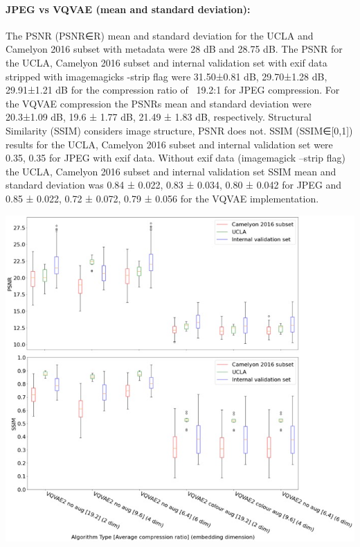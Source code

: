 \documentclass[review]{elsarticle}
\begin{document}
\paragraph{JPEG vs VQVAE (mean and standard deviation):} The PSNR (PSNR∈R) mean and standard deviation for the UCLA and Camelyon 2016 subset with metadata were 28 dB and 28.75 dB. The PSNR for the UCLA, Camelyon 2016 subset and internal validation set with exif data stripped with imagemagicks -strip flag were 31.50±0.81 dB, 29.70±1.28 dB, 29.91±1.21 dB for the compression ratio of ~19.2:1 for JPEG compression. For the VQVAE compression the PSNRs mean and standard deviation were 20.3±1.09 dB, 19.6 ± 1.77 dB, 21.49 ± 1.83 dB, respectively. Structural Similarity (SSIM) considers image structure, PSNR does not. SSIM (SSIM∈[0,1]) results for the UCLA, Camelyon 2016 subset and internal validation set were 0.35, 0.35 for JPEG with exif data. Without exif data (imagemagick –strip flag) the UCLA, Camelyon 2016 subset and internal validation set SSIM mean and standard deviation was 0.84 ± 0.022, 0.83 ± 0.034, 0.80 ± 0.042 for JPEG and 0.85 ± 0.022, 0.72 ± 0.072, 0.79 ± 0.056 for the VQVAE implementation.

\begin{center}
\includegraphics[width=1\linewidth]{Figures/VQVAE data augmentation PSNR SSIM comparison boxplot.jpeg}
\end{center}
\end{document}
